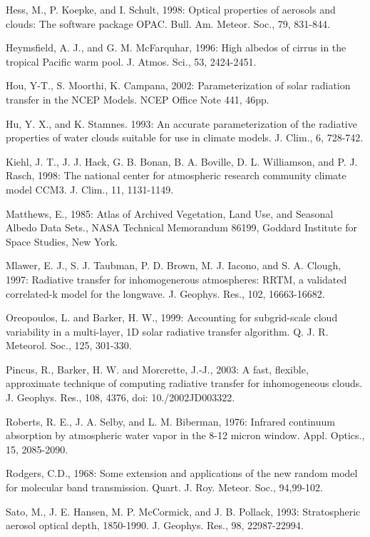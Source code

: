Hess, M., P. Koepke, and I. Schult, 1998\+: Optical properties of aerosols and clouds\+: The software package O\+P\+AC. Bull. Am. Meteor. Soc., 79, 831-\/844.

Heymsfield, A. J., and G. M. Mc\+Farquhar, 1996\+: High albedos of cirrus in the tropical Pacific warm pool. J. Atmos. Sci., 53, 2424-\/2451.

Hou, Y-\/T., S. Moorthi, K. Campana, 2002\+: Parameterization of solar radiation transfer in the N\+C\+EP Models. N\+C\+EP Office Note 441, 46pp.

Hu, Y. X., and K. Stamnes. 1993\+: An accurate parameterization of the radiative properties of water clouds suitable for use in climate models. J. Clim., 6, 728-\/742.

Kiehl, J. T., J. J. Hack, G. B. Bonan, B. A. Boville, D. L. Williamson, and P. J. Rasch, 1998\+: The national center for atmospheric research community climate model C\+C\+M3. J. Clim., 11, 1131-\/1149.

Matthews, E., 1985\+: Atlas of Archived Vegetation, Land Use, and Seasonal Albedo Data Sets., N\+A\+SA Technical Memorandum 86199, Goddard Institute for Space Studies, New York.

Mlawer, E. J., S. J. Taubman, P. D. Brown, M. J. Iacono, and S. A. Clough, 1997\+: Radiative transfer for inhomogenerous atmospheres\+: R\+R\+TM, a validated correlated-\/k model for the longwave. J. Geophys. Res., 102, 16663-\/16682.

Oreopoulos, L. and Barker, H. W., 1999\+: Accounting for subgrid-\/scale cloud variability in a multi-\/layer, 1D solar radiative transfer algorithm. Q. J. R. Meteorol. Soc., 125, 301-\/330.

Pincus, R., Barker, H. W. and Morcrette, J.-\/J., 2003\+: A fast, flexible, approximate technique of computing radiative transfer for inhomogeneous clouds. J. Geophys. Res., 108, 4376, doi\+: 10./2002\+J\+D003322.

Roberts, R. E., J. A. Selby, and L. M. Biberman, 1976\+: Infrared continuum absorption by atmospheric water vapor in the 8-\/12 micron window. Appl. Optics., 15, 2085-\/2090.

Rodgers, C.\+D., 1968\+: Some extension and applications of the new random model for molecular band transmission. Quart. J. Roy. Meteor. Soc., 94,99-\/102.

Sato, M., J. E. Hansen, M. P. Mc\+Cormick, and J. B. Pollack, 1993\+: Stratospheric aerosol optical depth, 1850-\/1990. J. Geophys. Res., 98, 22987-\/22994.

